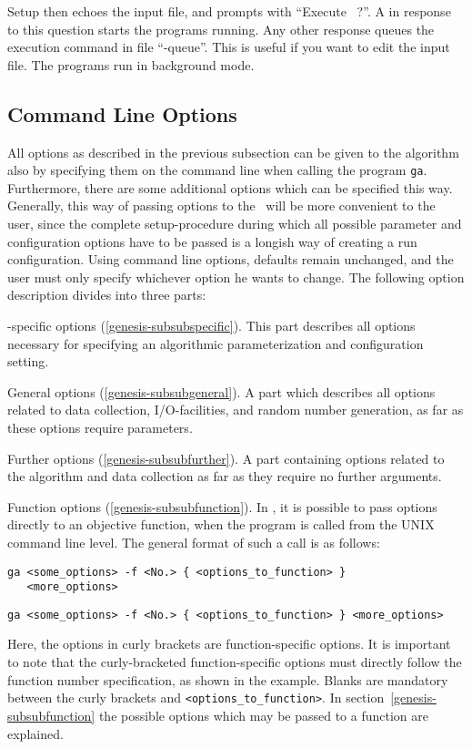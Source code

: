 %
Setup then echoes the input file, and prompts with ``Execute \GA\ ?''.  
A   in  response to this question starts the programs running.  
Any other response queues the execution  command  in  file  ``\GA-queue''.
This  is useful if you want to edit the input file.  
The  programs run in background mode.

\ifUS
	\newpage
\else
\fi 
\subsection{Command Line Options}\label{genesis-subopt}

All options as described in the previous subsection can be given to the
algorithm also by specifying them on the command line when calling the 
program \verb/ga/.
Furthermore, there are some additional options which can be specified this way.
Generally, this way of passing options to the \GA\ will be more convenient
to the user, since the complete setup-procedure during which all possible
parameter and configuration options have to be passed is a longish way of
creating a run configuration.
Using command line options, defaults remain unchanged, and the user must only
specify whichever option he wants to change.
The following option description divides into three parts:
%
\begin{Itemize}
%
\item	\GA-specific options (\ref{genesis-subsubspecific}).
	This part describes all options necessary for specifying an
	algorithmic parameterization and configuration setting.
%
\item	General options (\ref{genesis-subsubgeneral}).
	A part which describes all options related to data collection,
	I/O-facilities, and random number generation, as far as these
	options require parameters.
%
\item	Further options (\ref{genesis-subsubfurther}).
	A part containing options related to the algorithm and data collection
	as far as they require no further arguments.
%
\item	Function options (\ref{genesis-subsubfunction}).
	In \GEN, it is possible to pass options directly to an objective
	function, when the program is called from the UNIX command line level.
	The general format of such a call is as follows:
\ifUS
	\begin{flushleft}
     \verb/ga <some_options> -f <No.> { <options_to_function> }/	\\
     \verb/   <more_options>/
	\end{flushleft}
\else
	\begin{center}
     \verb/ga <some_options> -f <No.> { <options_to_function> } <more_options>/
	\end{center}
\fi
	Here, the options in curly brackets are function-specific options.
	It is important to note that the curly-bracketed function-specific
	options must directly follow the function number specification,
	as shown in the example.
	Blanks are mandatory between the curly brackets and 
	\verb/<options_to_function>/.
	In section~\ref{genesis-subsubfunction} the possible options 
	which may be passed to a function are explained.
%
\end{Itemize}

